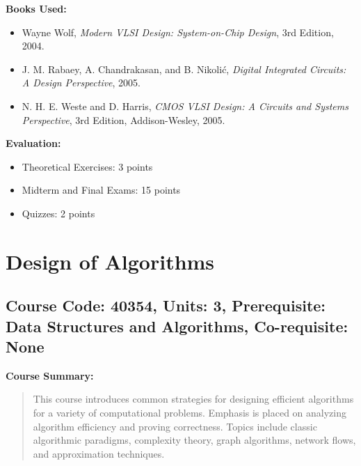 \documentclass[12pt]{article}
\begin{document}
\textbf{Books Used:}
\begin{itemize}
    \item Wayne Wolf, \textit{Modern VLSI Design: System-on-Chip Design}, 3rd Edition, 2004.
    \item J. M. Rabaey, A. Chandrakasan, and B. Nikolić, \textit{Digital Integrated Circuits: A Design Perspective}, 2005.
    \item N. H. E. Weste and D. Harris, \textit{CMOS VLSI Design: A Circuits and Systems Perspective}, 3rd Edition, Addison-Wesley, 2005.
\end{itemize}

\textbf{Evaluation:}
\begin{itemize}
    \item Theoretical Exercises: 3 points
    \item Midterm and Final Exams: 15 points
    \item Quizzes: 2 points
\end{itemize}

\newpage

\section{Design of Algorithms}
\subsection*{Course Code: 40354, Units: 3, Prerequisite: Data Structures and Algorithms, Co-requisite: None}

\textbf{Course Summary:}
\begin{quote}
This course introduces common strategies for designing efficient algorithms for a variety of computational problems. Emphasis is placed on analyzing algorithm efficiency and proving correctness. Topics include classic algorithmic paradigms, complexity theory, graph algorithms, network flows, and approximation techniques.
\end{quote}
\end{document}
